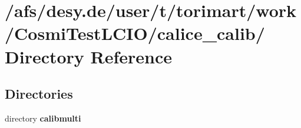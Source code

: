 \section{/afs/desy.de/user/t/torimart/work/CosmiTestLCIO/calice\_\-calib/ Directory Reference}
\label{dir_5116c8f7e4b5645f509e1533a2a6cce8}
\subsection*{Directories}
\begin{DoxyCompactItemize}
\item 
directory {\bf calibmulti}
\end{DoxyCompactItemize}
